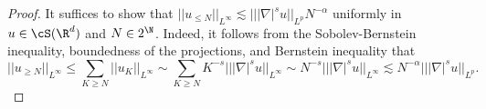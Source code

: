 \documentclass[reqno]{amsart}
\theoremstyle{definition}
\theoremstyle{remark}
\begin{document}
\begin{proof}
	It suffices to show that $||u_{\leq N}||_{L^\infty} \lesssim || |\nabla|^s u||_{L^p} N^{-\alpha}$ uniformly in $u \in \cS (\R^d)$ and $N \in 2^\N$. Indeed, it follows from the Sobolev-Bernstein inequality, boundedness of the projections, and Bernstein inequality that
		\[ ||u_{\geq N} ||_{L^\infty} \leq \sum_{K \geq N} ||u_K||_{L^\infty} \sim \sum_{K \geq N} K^{-s} || |\nabla|^s u||_{L^\infty} \sim N^{-s} |||\nabla|^s u||_{L^\infty} \lesssim N^{-\alpha} |||\nabla|^s u||_{L^p}. \]
\end{proof}




 
\end{document}

